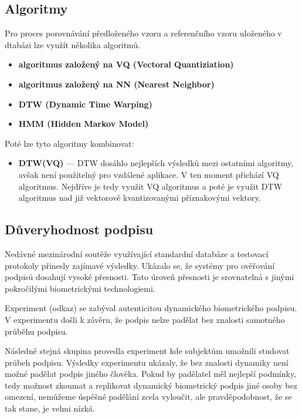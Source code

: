 \subsection*{Algoritmy}
Pro proces porovnávání předloženého vzoru a referenčního vzoru uloženého v dtabázi lze využít několika algoritmů.

\begin{itemize}
  \item \textbf{algoritmus založený na VQ (Vectoral Quantiziation)}
  \item \textbf{algoritmus založený na NN (Nearest Neighbor)}
  \item \textbf{DTW (Dynamic Time Warping)}
  \item \textbf{HMM (Hidden Markov Model)}
\end{itemize}

Poté lze tyto algoritmy kombinovat:
\begin{itemize}
  \item \textbf{DTW(VQ)} --- DTW dosáhlo nejlepších výsledků mezi ostatními algoritmy, avšak není použitelný pro vzdálené aplikace.
  V ten moment přichází VQ algoritmus. Nejdříve je tedy využit VQ algoritmus a poté je využit DTW algoritmus nad již vektorově kvantizovanými příznakovými vektory. 
\end{itemize}

\subsection*{Důveryhodnost podpisu}

Nedávné mezinárodní soutěže využívající standardní databáze a testovací protokoly přinesly zajímavé výsledky.   %
Ukázalo se, že systémy pro ověřování podpisů dosahují vysoké přesnosti.                                         %
Tato úroveň přesnosti je srovnatelná s jinými pokročilými biometrickými technologiemi.                          %

Experiment (odkaz) se zabýval autenticitou dynamického biometrického podpisu.
V experimentu došli k závěru, že podpis nelze padělat bez znalosti samotného průběhu podpisu. %

Následně stejná skupina provedla experiment kde subjektům umožnili studovat průbeh podpisu.
Výsledky experimentu ukázaly, že bez znalosti dynamiky není možné padělat podpis jiného člověka. 
Pokud by padělatel měl nejlepší podmínky, tedy možnost zkoumat a replikovat dynamický biometrický podpis jiné osoby bez omezení, 
nemůžeme úspěšné padělání zcela vyloučit, ale pravděpodobnost, že se tak stane, je velmi nízká. %

